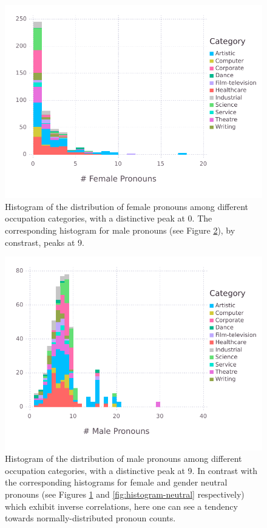 \documentclass[jair,twoside,11pt,theapa]{article}
\begin{document}
\begin{figure}[H]
  \centering
  \includegraphics[width=\linewidth]{pictures/histogram-female}
  \caption{Histogram of the distribution of female pronouns among different occupation categories, with a distinctive peak at 0. The corresponding histogram for male pronouns (see Figure \ref{fig:histogram-male}), by constrast, peaks at 9.}
  \label{fig:histogram-female}
\end{figure}

\begin{figure}[H]
  \centering
  \includegraphics[width=\linewidth]{pictures/histogram-male}
  \caption{Histogram of the distribution of male pronouns among different occupation categories, with a distinctive peak at 9. In contrast with the corresponding histograms for female and gender neutral pronouns (see Figures \ref{fig:histogram-female} and \ref{fig:histogram-neutral} respectively) which exhibit inverse correlations, here one can see a tendency towards normally-distributed pronoun counts.}
  \label{fig:histogram-male}
\end{figure}
\end{document}
